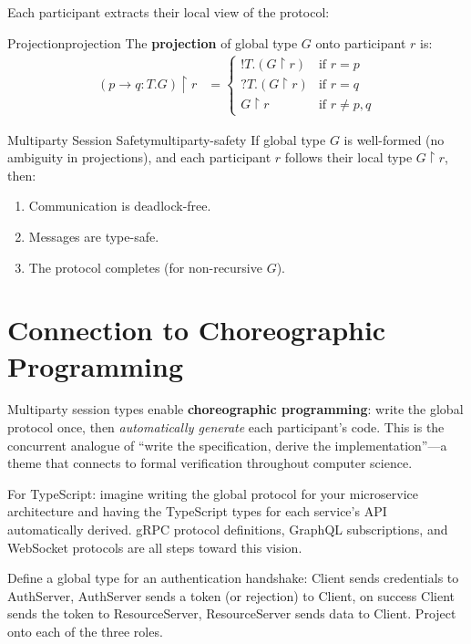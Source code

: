 \documentclass[11pt, a4paper, oneside]{book}
\newcounter{exercise}[chapter]
\begin{document}
Each participant extracts their local view of the protocol:

\begin{defn}{Projection}{projection}
The \textbf{projection} of global type $G$ onto participant $r$ is:
\begin{align*}
  (p \to q : T. G) \upharpoonright r &=
    \begin{cases}
      !T.(G \upharpoonright r) & \text{if } r = p \\
      ?T.(G \upharpoonright r) & \text{if } r = q \\
      G \upharpoonright r & \text{if } r \neq p, q
    \end{cases}
\end{align*}
\end{defn}

\begin{thm}{Multiparty Session Safety}{multiparty-safety}
If global type $G$ is well-formed (no ambiguity in projections), and each
participant $r$ follows their local type $G \upharpoonright r$, then:
\begin{enumerate}[nosep, label=(\roman*)]
\item Communication is deadlock-free.
\item Messages are type-safe.
\item The protocol completes (for non-recursive $G$).
\end{enumerate}
\end{thm}

\section{Connection to Choreographic Programming}

\begin{intuition}
Multiparty session types enable \textbf{choreographic programming}: write the
global protocol once, then \emph{automatically generate} each participant's
code. This is the concurrent analogue of ``write the specification, derive the
implementation''---a theme that connects to formal verification throughout
computer science.

For TypeScript: imagine writing the global protocol for your microservice
architecture and having the TypeScript types for each service's API
automatically derived. gRPC protocol definitions, GraphQL subscriptions, and
WebSocket protocols are all steps toward this vision.
\end{intuition}

\begin{exercisebox}[title={Exercise 11.1}]
Define a global type for an authentication handshake: Client sends credentials
to AuthServer, AuthServer sends a token (or rejection) to Client, on success
Client sends the token to ResourceServer, ResourceServer sends data to Client.
Project onto each of the three roles.
\end{exercisebox}
\end{document}
